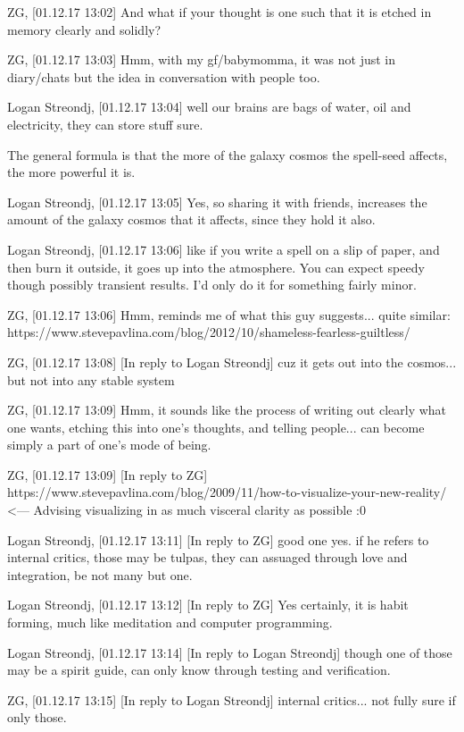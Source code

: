 ZG, [01.12.17 13:02]
And what if your thought is one such that it is etched in memory clearly and
solidly?

ZG, [01.12.17 13:03]
Hmm, with my gf/babymomma, it was not just in diary/chats but the idea in
conversation with people too.

Logan Streondj, [01.12.17 13:04]
well our brains are bags of water, oil and electricity, they can store stuff
sure.

The general formula is that the more of the galaxy cosmos the spell-seed
affects, the more powerful it is.

Logan Streondj, [01.12.17 13:05]
Yes, so sharing it with friends, increases the amount of the galaxy cosmos that
it affects, since they hold it also.

Logan Streondj, [01.12.17 13:06]
like if you write a spell on a slip of paper, and then burn it outside,  it goes
up into the atmosphere.  You can expect speedy though possibly transient
results.  I'd only do it for something fairly minor.

ZG, [01.12.17 13:06]
Hmm, reminds me of what this guy suggests... quite similar:
https://www.stevepavlina.com/blog/2012/10/shameless-fearless-guiltless/

ZG, [01.12.17 13:08]
[In reply to Logan Streondj]
cuz it gets out into the cosmos... but not into any stable system

ZG, [01.12.17 13:09]
Hmm, it sounds like the process of writing out clearly what one wants, etching
this into one's thoughts, and telling people... can become simply a part of
one's mode of being.

ZG, [01.12.17 13:09]
[In reply to ZG]
https://www.stevepavlina.com/blog/2009/11/how-to-visualize-your-new-reality/ <—
Advising visualizing in as much visceral clarity as possible :0

Logan Streondj, [01.12.17 13:11]
[In reply to ZG]
good one yes.   if he refers to internal critics, those may be tulpas,  they can
assuaged through love and integration, be not many but one.

Logan Streondj, [01.12.17 13:12]
[In reply to ZG]
Yes certainly, it is habit forming, much like meditation and computer
programming.

Logan Streondj, [01.12.17 13:14]
[In reply to Logan Streondj]
though one of those may be a spirit guide,  can only know through testing and
verification.

ZG, [01.12.17 13:15]
[In reply to Logan Streondj]
internal critics... not fully sure if only those. 

